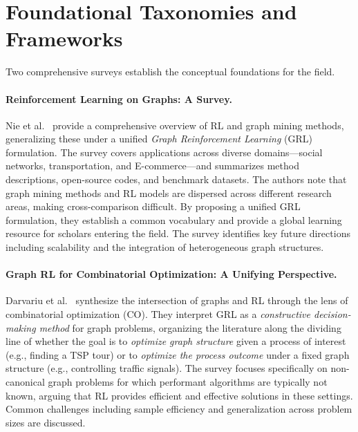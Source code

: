 \documentclass{article}
\begin{document}
\section{Foundational Taxonomies and Frameworks}
\label{sec:foundations}

Two comprehensive surveys establish the conceptual foundations for the field.

\paragraph{Reinforcement Learning on Graphs: A Survey.}
Nie et al.~\cite{nie2023} provide a comprehensive overview of RL and graph mining methods, generalizing these under a unified \textit{Graph Reinforcement Learning} (GRL) formulation. The survey covers applications across diverse domains---social networks, transportation, and E-commerce---and summarizes method descriptions, open-source codes, and benchmark datasets. The authors note that graph mining methods and RL models are dispersed across different research areas, making cross-comparison difficult. By proposing a unified GRL formulation, they establish a common vocabulary and provide a global learning resource for scholars entering the field. The survey identifies key future directions including scalability and the integration of heterogeneous graph structures.

\paragraph{Graph RL for Combinatorial Optimization: A Unifying Perspective.}
Darvariu et al.~\cite{berto2024} synthesize the intersection of graphs and RL through the lens of combinatorial optimization (CO). They interpret GRL as a \textit{constructive decision-making method} for graph problems, organizing the literature along the dividing line of whether the goal is to \textit{optimize graph structure} given a process of interest (e.g., finding a TSP tour) or to \textit{optimize the process outcome} under a fixed graph structure (e.g., controlling traffic signals). The survey focuses specifically on non-canonical graph problems for which performant algorithms are typically not known, arguing that RL provides efficient and effective solutions in these settings. Common challenges including sample efficiency and generalization across problem sizes are discussed.

\end{document}
